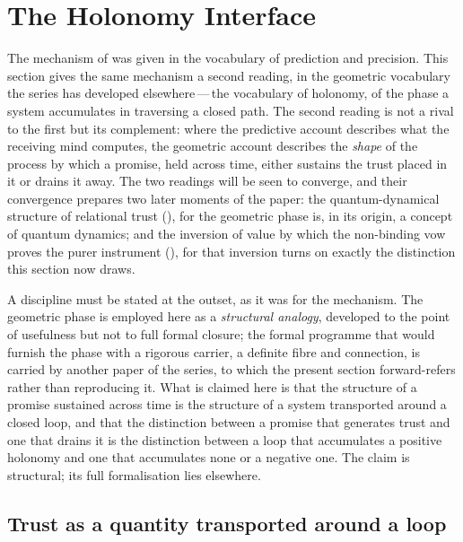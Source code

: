 \section{The Holonomy Interface}
\label{p13:sec:holonomy}

\noindent
The mechanism of  was given in the vocabulary of prediction and precision. This section gives the same mechanism a second reading, in the geometric vocabulary the series has developed elsewhere\,---\,the vocabulary of holonomy, of the phase a system accumulates in traversing a closed path. The second reading is not a rival to the first but its complement: where the predictive account describes what the receiving mind computes, the geometric account describes the \emph{shape} of the process by which a promise, held across time, either sustains the trust placed in it or drains it away. The two readings will be seen to converge, and their convergence prepares two later moments of the paper: the quantum-dynamical structure of relational trust (), for the geometric phase is, in its origin, a concept of quantum dynamics; and the inversion of value by which the non-binding vow proves the purer instrument (), for that inversion turns on exactly the distinction this section now draws.

A discipline must be stated at the outset, as it was for the mechanism. The geometric phase is employed here as a \emph{structural analogy}, developed to the point of usefulness but not to full formal closure; the formal programme that would furnish the phase with a rigorous carrier, a definite fibre and connection, is carried by another paper of the series, to which the present section forward-refers rather than reproducing it. What is claimed here is that the structure of a promise sustained across time is the structure of a system transported around a closed loop, and that the distinction between a promise that generates trust and one that drains it is the distinction between a loop that accumulates a positive holonomy and one that accumulates none or a negative one. The claim is structural; its full formalisation lies elsewhere.

\subsection{Trust as a quantity transported around a loop}
\label{p13:sub:holo-loop}

